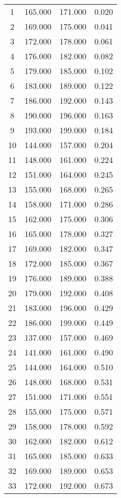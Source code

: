 % 
\begin{tabular}{cccc}
  \hline
  \hline
1 & 165.000 & 171.000 & 0.020 \\ 
  2 & 169.000 & 175.000 & 0.041 \\ 
  3 & 172.000 & 178.000 & 0.061 \\ 
  4 & 176.000 & 182.000 & 0.082 \\ 
  5 & 179.000 & 185.000 & 0.102 \\ 
  6 & 183.000 & 189.000 & 0.122 \\ 
  7 & 186.000 & 192.000 & 0.143 \\ 
  8 & 190.000 & 196.000 & 0.163 \\ 
  9 & 193.000 & 199.000 & 0.184 \\ 
  10 & 144.000 & 157.000 & 0.204 \\ 
  11 & 148.000 & 161.000 & 0.224 \\ 
  12 & 151.000 & 164.000 & 0.245 \\ 
  13 & 155.000 & 168.000 & 0.265 \\ 
  14 & 158.000 & 171.000 & 0.286 \\ 
  15 & 162.000 & 175.000 & 0.306 \\ 
  16 & 165.000 & 178.000 & 0.327 \\ 
  17 & 169.000 & 182.000 & 0.347 \\ 
  18 & 172.000 & 185.000 & 0.367 \\ 
  19 & 176.000 & 189.000 & 0.388 \\ 
  20 & 179.000 & 192.000 & 0.408 \\ 
  21 & 183.000 & 196.000 & 0.429 \\ 
  22 & 186.000 & 199.000 & 0.449 \\ 
  23 & 137.000 & 157.000 & 0.469 \\ 
  24 & 141.000 & 161.000 & 0.490 \\ 
  25 & 144.000 & 164.000 & 0.510 \\ 
  26 & 148.000 & 168.000 & 0.531 \\ 
  27 & 151.000 & 171.000 & 0.551 \\ 
  28 & 155.000 & 175.000 & 0.571 \\ 
  29 & 158.000 & 178.000 & 0.592 \\ 
  30 & 162.000 & 182.000 & 0.612 \\ 
  31 & 165.000 & 185.000 & 0.633 \\ 
  32 & 169.000 & 189.000 & 0.653 \\ 
  33 & 172.000 & 192.000 & 0.673 \\ 

\end{tabular}
